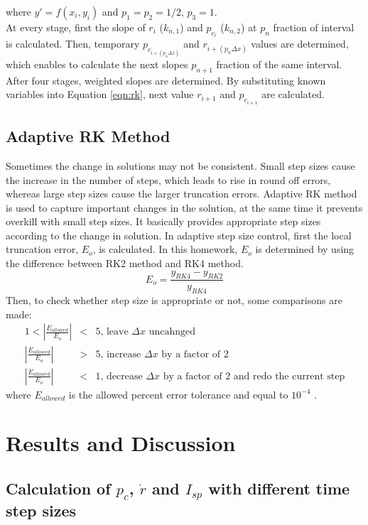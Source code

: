 \documentclass[letterpaper,12pt]{article}
\begin{document}
where $y\prime = f(x_i,y_i)$ and $p_1=p_2=1/2$, $p_3=1$.\\
At every stage, first the slope of $r_i$ ($k_{n,1}$) and  $p_{c_{i}}$ ($k_{n,2}$) at $p_n$ fraction of interval is calculated. 
Then, temporary $p_{c_{i+(p_n\Delta x)}}$ and $r_{i+(p_n\Delta x)}$ values are determined, which enables to calculate the next 
slopes $p_{n+1}$ fraction of the same interval. After four stages, weighted slopes are determined. By substituting known 
variables into Equation \ref{eqn:rk}, next value $r_{i+1}$ and $p_{c_{i+1}}$ are calculated. 
\subsection{Adaptive RK Method}
\label{section:adaptive}
Sometimes the change in solutions may not be consistent. Small step sizes cause the increase in the number of steps, which leads to
rise in round off errors, whereas large step sizes cause the larger truncation errors. Adaptive RK method is used to capture important
changes in the solution, at the same time it prevents overkill with small step sizes. It basically provides appropriate step sizes 
according to the change in solution. In adaptive step size control, first the local truncation error, $E_o$, is calculated. In this 
homework, $E_o$ is determined by using the difference between RK2 method and RK4 method.
\begin{equation}
	E_o = \frac{y_{RK4}-y_{RK2}}{y_{RK4}}
\end{equation}
Then, to check whether step size is appropriate or not, some comparisons are made:
\begin{eqnarray}
	1 < \left\lvert \frac{E_{allowed}}{E_o} \right\rvert &<& 5 \textrm{, leave $\Delta x$ uncahnged} \nonumber \\
	\left\lvert \frac{E_{allowed}}{E_o} \right\rvert &>& 5  \textrm{, increase $\Delta x$ by a factor of 2} \nonumber \\
	\left\lvert \frac{E_{allowed}}{E_o} \right\rvert &<& 1  \textrm{, decrease $\Delta x$ by a factor of 2 and redo the current step} \nonumber 
\end{eqnarray}
where $E_{allowed}$ is the allowed percent error tolerance and equal to $10^{-4}$  .


\newpage

\section{Results and Discussion}
\subsection{Calculation of $p_c$, $\dot{r}$ and $I_{sp}$ with different time step sizes}
\end{document}
